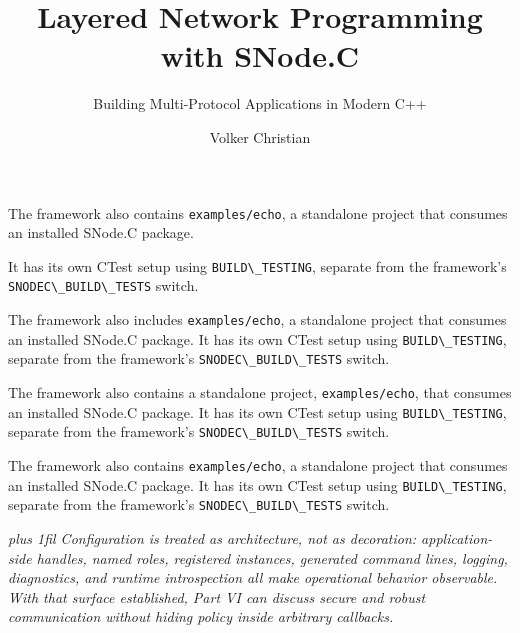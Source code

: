 \documentclass[
  a4paper,
  openany]{book}
\title{Layered Network Programming with SNode.C}
\subtitle{Building Multi-Protocol Applications in Modern C++}
\author{Volker Christian}
\date{}
\providecommand{\passthrough}[1]{#1}
\begin{document}
\raggedbottom
{}
The framework also contains \passthrough{\lstinline!examples/echo!}, a
standalone project that consumes an installed SNode.C package.

It has
its own CTest setup using \passthrough{\lstinline!BUILD\_TESTING!},
separate from the framework's
\passthrough{\lstinline!SNODEC\_BUILD\_TESTS!} switch.
\par\clearpage
{}
The framework also includes \passthrough{\lstinline!examples/echo!}, a
standalone project that consumes an installed SNode.C package. It has
its own CTest setup using \passthrough{\lstinline!BUILD\_TESTING!},
separate from the framework's
\passthrough{\lstinline!SNODEC\_BUILD\_TESTS!} switch.
\par\clearpage
{}
The framework also contains a standalone project, \passthrough{\lstinline!examples/echo!},
that consumes an installed SNode.C package. It has
its own CTest setup using \passthrough{\lstinline!BUILD\_TESTING!},
separate from the framework's
\passthrough{\lstinline!SNODEC\_BUILD\_TESTS!} switch.
\par\clearpage
{}
{ The framework also contains \passthrough{\lstinline!examples/echo!}, a
standalone project that consumes an installed SNode.C package. It has
its own CTest setup using \passthrough{\lstinline!BUILD\_TESTING!},
separate from the framework's
\passthrough{\lstinline!SNODEC\_BUILD\_TESTS!} switch.\par}
\par\clearpage
{}
{\large\itshape{}\textwidth{}\textwidth plus 1fil Configuration is treated as architecture, not as decoration:
application-side handles, named roles, registered instances, generated
command lines, logging, diagnostics, and runtime introspection all make
operational behavior observable. With that surface established, Part VI
can discuss secure and robust communication without hiding policy inside
arbitrary callbacks.\par}\clearpage
\end{document}
